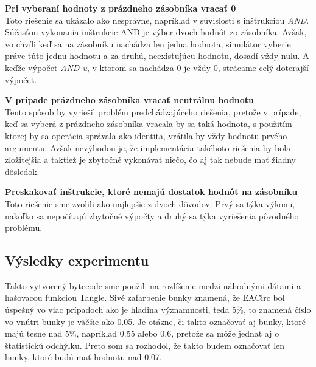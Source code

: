 \begin{myItemize}
 \item \textbf{Pri vyberaní hodnoty z prázdneho zásobníka vracať 0}\\Toto riešenie sa ukázalo ako nesprávne, napríklad v súvislosti s inštrukciou \textit{AND}. Súčasťou vykonania inštrukcie AND je výber dvoch hodnôt zo zásobníka. Avšak, vo chvíli keď sa na zásobníku nachádza len jedna hodnota, simulátor vyberie práve túto jednu hodnotu a za druhú, neexistujúcu hodnotu, dosadí vždy nulu. A keďže výpočet \textit{AND-u}, v ktorom sa nachádza 0 je vždy 0, strácame celý doterajší výpočet.
 \item \textbf{V prípade prázdneho zásobníka vracať neutrálnu hodnotu}\\Tento spôsob by vyriešil problém predchádzajúceho riešenia, pretože v prípade, keď sa vyberá z prázdneho zásobníka vracala by sa taká hodnota, s použitím ktorej by sa operácia správala ako identita, vrátila by vždy hodnotu prvého argumentu. Avšak nevýhodou je, že implementácia takéhoto riešenia by bola zložitejšia a taktiež je zbytočné vykonávať niečo, čo aj tak nebude mať žiadny dôsledok. 
 \item \textbf{Preskakovať inštrukcie, ktoré nemajú dostatok hodnôt na zásobníku}\\Toto riešenie sme zvolili ako najlepšie z dvoch dôvodov. Prvý sa týka výkonu, nakoľko sa nepočítajú zbytočné výpočty a druhý sa týka vyriešenia pôvodného problému. 
\end{myItemize}

\subsection{Výsledky experimentu}
\label{subsec:exp1-results}

Takto vytvorený bytecode sme použili na rozlíšenie medzi náhodnými dátami a hašovacou funkciou Tangle. Sivé zafarbenie bunky znamená, že EACirc bol úspešný vo viac prípadoch ako je hladina významnosti, teda 5\%, to znamená číslo vo vnútri bunky je väčšie ako 0.05. Je otázne, či takto označovať aj bunky, ktoré majú tesne nad 5\%, napríklad 0.55 alebo 0.6, pretože sa môže jednať aj o štatistickú odchýlku. Preto som sa rozhodol, že takto budem označovať len bunky, ktoré budú mať hodnotu nad 0.07. 
 
